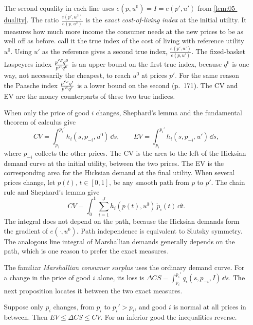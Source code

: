 The second equality in each line uses $e(p, u^0) = I = e(p', u')$ from \cref{lem:05-duality}. The ratio
$\frac{e(p', u^0)}{e(p, u^0)}$ is the \emph{exact cost-of-living index} at the initial utility. It measures
how much more income the consumer needs at the new prices to be as well off as before.
\citet[\S 7.1, eqs.~1.1--1.2, pp.~170--171]{DeatonMuellbauer1980b} call it the true index of the cost of
living with reference utility $u^0$. Using $u'$ as the reference gives a second true index,
$\frac{e(p', u')}{e(p, u')}$. The fixed-basket Laspeyres index $\frac{p'^\T q^0}{p^\T q^0}$ is an upper
bound on the first true index, because $q^0$ is one way, not necessarily the cheapest, to reach $u^0$ at
prices $p'$.
For the same reason the Paasche index $\frac{p'^\T q'}{p^\T q'}$ is a lower bound on the second (p.~171).
The CV and EV are the money counterparts of these two true indices.

When only the price of good $i$ changes, Shephard's lemma and the fundamental theorem of calculus give
\begin{equation}\label{eq:05-cv-area}
CV = \int_{p_i}^{p_i'}h_i(s, p_{-i}, u^0)\,\dd s, \qquad EV = \int_{p_i}^{p_i'}h_i(s, p_{-i}, u')\,\dd s ,
\end{equation}
where $p_{-i}$ collects the other prices. The CV is the area to the left of the Hicksian demand curve at the
initial utility, between the two prices. The EV is the corresponding area for the Hicksian demand at the final
utility. When several prices change, let $p(t)$, $t \in [0, 1]$, be any smooth path from $p$ to $p'$. The
chain rule and Shephard's lemma give
\begin{equation}\label{eq:05-cv-path}
CV = \int_0^1\sum_{i=1}^J h_i(p(t), u^0)\,\dot p_i(t)\,\dd t .
\end{equation}
The integral does not depend on the path, because the Hicksian demands form the gradient of $e(\cdot, u^0)$.
Path independence is equivalent to Slutsky symmetry. The analogous line integral of Marshallian demands
generally depends on the path, which is one reason to prefer the exact measures.

The familiar \emph{Marshallian consumer surplus} uses the ordinary demand curve. For a change in the price of
good $i$ alone, its loss is $\Delta CS = \int_{p_i}^{p_i'}q_i(s, p_{-i}, I)\,\dd s$. The next proposition
locates it between the two exact measures.

\begin{proposition}\label{prop:05-cv-ordering}
Suppose only $p_i$ changes, from $p_i$ to $p_i' > p_i$, and good $i$ is normal at all prices in between.
Then $EV \leq \Delta CS \leq CV$. For an inferior good the inequalities reverse.
\end{proposition}

